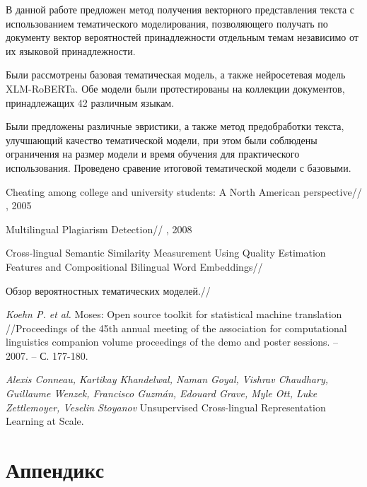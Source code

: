 \documentclass[12pt, twoside]{article}
\begin{document}
В данной работе предложен метод получения векторного представления текста с использованием тематического моделирования, позволяющего получать по документу вектор вероятностей принадлежности отдельным темам независимо от их языковой принадлежности.

Были рассмотрены базовая тематическая модель, а также нейросетевая модель XLM-RoBERTa. Обе модели были протестированы на коллекции документов, принадлежащих 42 различным языкам.

Были предложены различные эвристики, а также метод предобработки текста, улучшающий качество тематической модели, при этом были соблюдены ограничения на размер модели и время обучения для практического использования. Проведено сравение итоговой тематической модели с базовыми.

\begin{thebibliography}{5}

    Cheating among college and university students: A North American perspective//
    , 2005
    
    Multilingual Plagiarism Detection//
    , 2008
    
    Cross-lingual Semantic Similarity Measurement Using Quality Estimation Features and Compositional Bilingual Word Embeddings//
    
    Обзор вероятностных тематических моделей.//
  
  \textit{Koehn P. et al.} Moses: Open source toolkit for statistical machine translation //Proceedings of the 45th annual meeting of the association for computational linguistics companion volume proceedings of the demo and poster sessions. – 2007. – С. 177-180.

  \textit{Alexis Conneau, Kartikay Khandelwal, Naman Goyal, Vishrav Chaudhary, Guillaume Wenzek, Francisco Guzmán, Edouard Grave, Myle Ott, Luke Zettlemoyer, Veselin Stoyanov} Unsupervised Cross-lingual Representation Learning at Scale.
	  
\end{thebibliography}

\section{Аппендикс}
\end{document}
